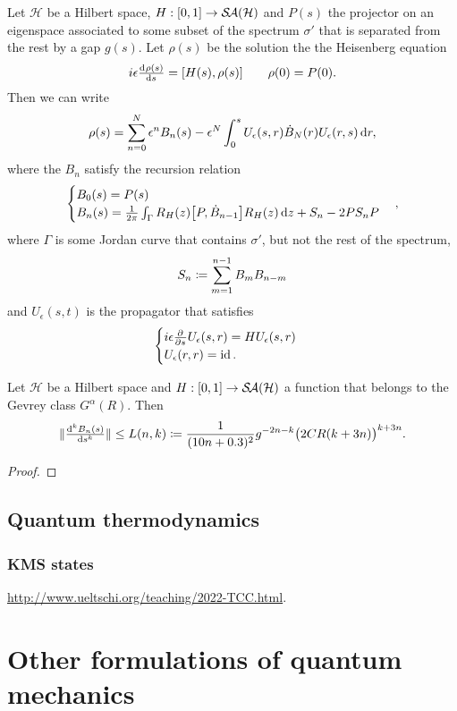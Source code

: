 \begin{proposition}
Let $\mathcal{H}$ be a Hilbert space, $H: \interval{0,1}\to \SelfAdjoints(\mathcal{H})$ and $P(s)$ the projector on an eigenspace associated to some subset of the spectrum $\sigma'$ that is separated from the rest by a gap $g(s)$. Let $\rho(s)$ be the solution the the Heisenberg equation
\[ i\epsilon \od{\rho(s)}{s} = [H(s), \rho(s)] \qquad \rho(0)= P(0). \]
Then we can write
\[ \rho(s) = \sum_{n=0}^N \epsilon^nB_n(s) - \epsilon^N\int_0^s U_\epsilon(s,r)\dot{B}_N(r)U_\epsilon(r,s) \operatorname{d \!}{r}, \]
where the $B_n$ satisfy the recursion relation
\[ \begin{cases}
B_0(s) = P(s) \\
B_n(s) = \frac{1}{2\pi}\int_\Gamma R_H(z)\big[P, \dot{B}_{n-1}\big]R_H(z) \operatorname{d \!}{z} + S_n - 2PS_nP
\end{cases}, \]
where $\Gamma$ is some Jordan curve that contains $\sigma'$, but not the rest of the spectrum,
\[ S_n \coloneqq \sum_{m=1}^{n-1}B_mB_{n-m} \]
and $U_\epsilon(s,t)$ is the propagator that satisfies
\[ \begin{cases}
i\epsilon  \frac{\partial{^{}}}{\partial{{s}^{}}} U_\epsilon(s,r) = HU_\epsilon(s,r) \\
U_\epsilon(r,r) = \operatorname{id}.
\end{cases} \]
\end{proposition}

\begin{lemma}
Let $\mathcal{H}$ be a Hilbert space and $H: \interval{0,1}\to \SelfAdjoints(\mathcal{H})$ a function that belongs to the Gevrey class $G^\alpha(R)$. Then
\[ \norm{\od[k]{B_n(s)}{s}} \leq L(n,k) \defeq \frac{1}{(10n + 0.3)^2}g^{-2n-k}\big(2CR(k+3n)\big)^{k+3n}. \]
\end{lemma}
\begin{proof}

\end{proof}

\section{Quantum thermodynamics}
\subsection{KMS states}
\url{http://www.ueltschi.org/teaching/2022-TCC.html}.

\chapter{Other formulations of quantum mechanics}
